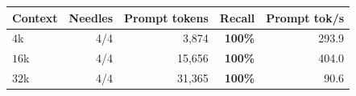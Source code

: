 \begin{tabular}{lrrrr}
\toprule
Context & Needles & Prompt tokens & Recall & Prompt tok/s \\
\midrule
$4$k  & 4/4 & 3{,}874 & \textbf{100\%} & 293.9 \\
$16$k & 4/4 & 15{,}656 & \textbf{100\%} & 404.0 \\
$32$k & 4/4 & 31{,}365 & \textbf{100\%} & \phantom{0}90.6 \\
\bottomrule
\end{tabular}
